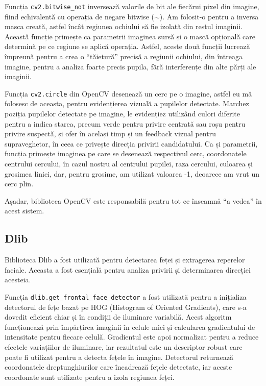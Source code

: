 \documentclass[12pt,a4paper]{article}
\begin{document}
Funcția \texttt{cv2.bitwise\_not} inversează valorile de bit ale fiecărui pixel
din imagine, fiind echivalentă cu operația de negare bitwise ($\sim$). Am
folosit-o pentru a inversa masca creată, astfel încât regiunea ochiului
să fie izolată din restul imaginii. Această funcție primește ca
parametrii imaginea sursă și o mască opțională care determină pe ce
regiune se aplică operația. Astfel, aceste două funcții lucrează
împreună pentru a crea o ``tăietură'' precisă a regiunii ochiului, din
întreaga imagine, pentru a analiza foarte precis pupila, fără
interferențe din alte părți ale imaginii.

Funcția \texttt{cv2.circle} din OpenCV desenează un cerc pe o imagine, astfel eu
mă folosesc de aceasta, pentru evidențierea vizuală a pupilelor
detectate. Marchez poziția pupilelor detectate pe imagine, le evidențiez
utilizând culori diferite pentru a indica starea, precum verde pentru
privire centrată sau roșu pentru privire suspectă, și ofer în același
timp și un feedback vizual pentru supraveghetor, în ceea ce privește
direcția privirii candidatului. Ca și parametrii, funcția primește
imaginea pe care se desenează respectivul cerc, coordonatele centrului
cercului, în cazul nostru al centrului pupilei, raza cercului, culoarea
și grosimea liniei, dar, pentru grosime, am utilizat valoarea -1,
deoarece am vrut un cerc plin.

Așadar, biblioteca OpenCV este responsabilă pentru tot ce înseamnă ``a
vedea'' în acest sistem.

\subsection{Dlib}
Biblioteca Dlib a fost utilizată pentru detectarea feței și extragerea reperelor faciale\cite{dlib}. Aceasta a fost esențială pentru analiza privirii și determinarea direcției acesteia. 

Funcția \texttt{dlib.get\_frontal\_face\_detector} a fost utilizată pentru a inițializa detectorul de fețe bazat pe HOG (Histogram of Oriented Gradients), care s-a dovedit eficient chiar și în condiții de iluminare variabilă. Acest algoritm funcționează prin împărțirea imaginii în celule mici și calcularea gradientului de intensitate pentru fiecare celulă. Gradientul este apoi normalizat pentru a reduce efectele variațiilor de iluminare, iar rezultatul este un descriptor robust care poate fi utilizat pentru a detecta fețele în imagine. Detectorul returnează coordonatele dreptunghiurilor care încadrează fețele detectate, iar aceste coordonate sunt utilizate pentru a izola regiunea feței.
\end{document}
